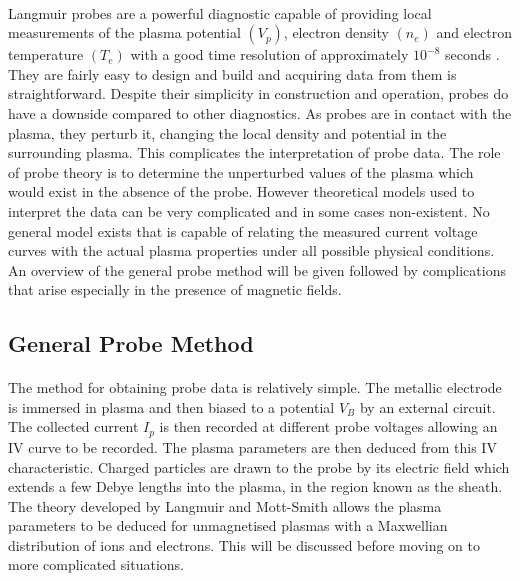 \documentclass[12pt]{article}
\begin{document}
\paragraph{}
Langmuir probes are a powerful diagnostic capable of providing local measurements of the plasma potential $(V_{p})$, electron density $(n_e)$ and electron temperature $(T_e)$ with a good time resolution of approximately $10^{-8}$ seconds \cite{probetheoryandpractise}. They are fairly easy to design and build and acquiring data from them is straightforward. Despite their simplicity in construction and operation, probes do have a downside compared to other diagnostics. As probes are in contact with the plasma, they perturb it, changing the local density and potential in the surrounding plasma. This complicates the interpretation of probe data. The role of probe theory is to determine the unperturbed values of the plasma which would exist in the absence of the probe. However theoretical models used to interpret the data can be very complicated and in some cases non-existent. No general model exists that is capable of relating the measured current voltage curves with the actual plasma properties under all possible physical conditions. An overview of the general probe method will be given followed by complications that arise especially in the presence of magnetic fields. 

\subsection{General Probe Method}
\paragraph{}
The method for obtaining probe data is relatively simple. The metallic electrode is immersed in plasma and then biased to a potential $V_B$ by an external circuit. The collected current $I_p$ is then recorded at different probe voltages allowing an IV curve to be recorded. The plasma parameters are then deduced from this IV characteristic.  Charged particles are drawn to the probe by its electric field which extends a few Debye lengths into the plasma, in the region known as the sheath. The theory developed by Langmuir and Mott-Smith allows the plasma parameters to be deduced for unmagnetised plasmas with a Maxwellian distribution of ions and electrons. This will be discussed before moving on to more complicated situations. 
\end{document}
